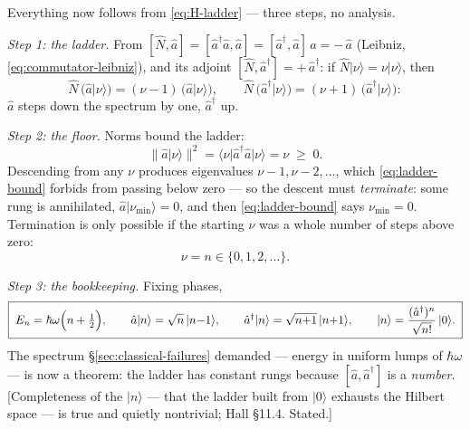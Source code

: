 \documentclass[11pt]{article}
\theoremstyle{plain}
\theoremstyle{definition}
\theoremstyle{remark}
\newcommand{\op}[1]{\hat{#1}}
\newcommand{\ket}[1]{\lvert #1 \rangle}
\newcommand{\bra}[1]{\langle #1 \rvert}
\begin{document}
Everything now follows from \eqref{eq:H-ladder} --- three steps, no
analysis.

\emph{Step 1: the ladder.} From
$[\op N, \op a] = [\op a^\dagger\op a, \op a]
= [\op a^\dagger, \op a]\,\op a = -\,\op a$ (Leibniz,
\eqref{eq:commutator-leibniz}), and its adjoint
$[\op N, \op a^\dagger] = +\,\op a^\dagger$: if
$\op N\ket\nu = \nu\ket\nu$, then
\begin{equation}
  \op N\,\bigl(\op a\ket\nu\bigr)
  = (\nu - 1)\,\bigl(\op a\ket\nu\bigr),
  \qquad
  \op N\,\bigl(\op a^\dagger\ket\nu\bigr)
  = (\nu + 1)\,\bigl(\op a^\dagger\ket\nu\bigr) :
\end{equation}
$\op a$ steps down the spectrum by one, $\op a^\dagger$ up.

\emph{Step 2: the floor.} Norms bound the ladder:
\begin{equation}
  \bigl\|\op a\ket\nu\bigr\|^2
  = \bra\nu\op a^\dagger\op a\ket\nu
  = \nu
  \;\ge\; 0 .
  \label{eq:ladder-bound}
\end{equation}
Descending from any $\nu$ produces eigenvalues $\nu - 1, \nu - 2,
\dots$, which \eqref{eq:ladder-bound} forbids from passing below
zero --- so the descent must \emph{terminate}: some rung is
annihilated, $\op a\ket{\nu_{\min}} = 0$, and then
\eqref{eq:ladder-bound} says $\nu_{\min} = 0$. Termination is only
possible if the starting $\nu$ was a whole number of steps above
zero:
\begin{equation}
  \nu = n \in \{0, 1, 2, \dots\} .
\end{equation}

\emph{Step 3: the bookkeeping.} Fixing phases,
\begin{equation}
  \boxed{\;
  E_n = \hbar\omega\Bigl(n + \tfrac12\Bigr),
  \qquad
  \op a\ket n = \sqrt n\,\ket{n{-}1},
  \qquad
  \op a^\dagger\ket n = \sqrt{n{+}1}\,\ket{n{+}1},
  \qquad
  \ket n = \frac{(\op a^\dagger)^n}{\sqrt{n!}}\,\ket 0 .
  \;}
  \label{eq:sho-spectrum}
\end{equation}
The spectrum \S\ref{sec:classical-failures} demanded --- energy in
uniform lumps of $\hbar\omega$ --- is now a theorem: the ladder has
constant rungs because $[\op a, \op a^\dagger]$ is a \emph{number}.
[Completeness of the $\ket n$ --- that the ladder built from
$\ket 0$ exhausts the Hilbert space --- is true and quietly
nontrivial; Hall \S11.4. Stated.]
\end{document}
